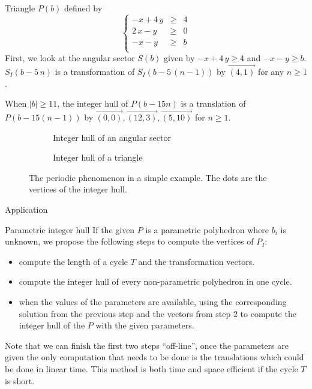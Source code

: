 \begin{frame}
	Triangle $P(b)$ defined by
	\begin{equation}
		\left\{   \begin{array}{crl}
			-x+4\,y &\ge& 4  \\
			2\,x-y&\ge& 0  \\
			-x -y &\ge& b  \\
		\end{array}
		\right.	
	\end{equation}
	First, we look at the angular sector $S(b)$ given by $-x+4\,y \ge 4$ and $-x -y \ge b$. $S_I( b - 5\,n)$ is a transformation of $S_I(b- 5\,(n-1))$ by $\vec{(4,1)}$ for any $n \ge 1$. 
	
	When $ \lvert b\rvert \ge 11$, the integer hull of $P(b -15n)$ is a translation of $P(b-15(n-1))$ by $\vec{(0,0)},\vec{(12,3)},\vec{(5,10)}$ for $n \ge 1$.
	
	\begin{figure}[H]
		\begin{subfigure}{.42\textwidth}
			\centering
			\caption{Integer hull of an angular sector}
			\label{fig:sec_anim}
		\end{subfigure}
		\hfill
		\begin{subfigure}{.42\textwidth}
			\centering
			\caption{Integer hull of a triangle}
			\label{fig:tri_anim}
		\end{subfigure}
		\caption{The periodic phenomenon in a simple example. The dots are the vertices of the integer hull.}
		\label{fig:simple}
	\end{figure}
\end{frame}


\iffalse
\begin{frame}{Application}
	\begin{block}{Parametric integer hull}
	If the given $P$ is a parametric polyhedron where $b_i$ is unknown, we propose the following steps to compute the vertices of $P_I$:
	\begin{itemize}
		\item compute the length of a cycle $T$ and the transformation vectors.
		\item compute the integer hull of every non-parametric polyhedron in one cycle. 
		\item when the values of the parameters are available, using the corresponding solution from the previous step and the vectors from step 2 to compute the integer hull of the $P$ with the given parameters.
	\end{itemize}
	
	Note that we can finish the first two steps ``off-line'', once the parameters are given the only computation that needs to be done is the translations which could be done in linear time. This method is both time and space efficient if the cycle $T$ is short.
\end{block} 
	
\end{frame}


